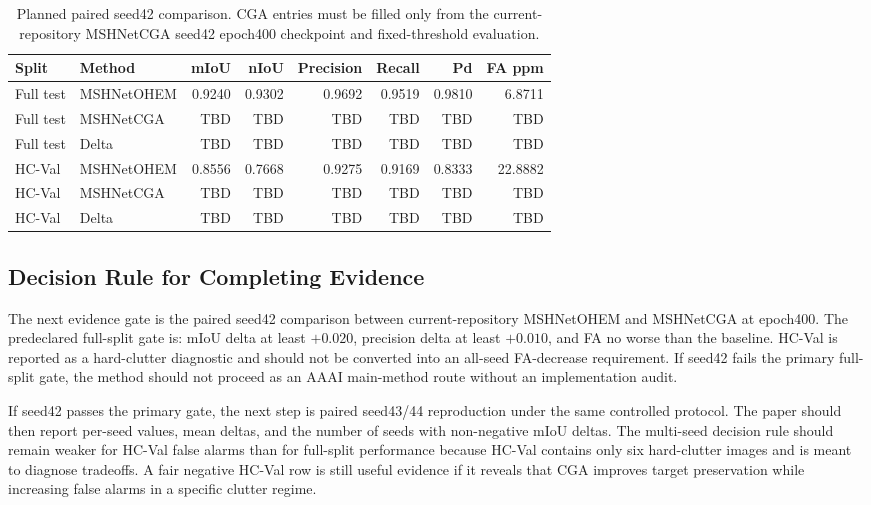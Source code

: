\documentclass[letterpaper]{article}
\begin{document}
\begin{table}[t]
\centering
\caption{Planned paired seed42 comparison. CGA entries must be filled only from the current-repository MSHNetCGA seed42 epoch400 checkpoint and fixed-threshold evaluation.}
\label{tab:paired-main}
\small
\begin{tabular}{llrrrrrr}
\toprule
Split & Method & mIoU & nIoU & Precision & Recall & Pd & FA ppm \\
\midrule
Full test & MSHNetOHEM & 0.9240 & 0.9302 & 0.9692 & 0.9519 & 0.9810 & 6.8711 \\
Full test & MSHNetCGA & TBD & TBD & TBD & TBD & TBD & TBD \\
Full test & Delta & TBD & TBD & TBD & TBD & TBD & TBD \\
\midrule
HC-Val & MSHNetOHEM & 0.8556 & 0.7668 & 0.9275 & 0.9169 & 0.8333 & 22.8882 \\
HC-Val & MSHNetCGA & TBD & TBD & TBD & TBD & TBD & TBD \\
HC-Val & Delta & TBD & TBD & TBD & TBD & TBD & TBD \\
\bottomrule
\end{tabular}
\end{table}

\subsection{Decision Rule for Completing Evidence}

The next evidence gate is the paired seed42 comparison between current-repository MSHNetOHEM and MSHNetCGA at epoch400. The predeclared full-split gate is: mIoU delta at least $+0.020$, precision delta at least $+0.010$, and FA no worse than the baseline. HC-Val is reported as a hard-clutter diagnostic and should not be converted into an all-seed FA-decrease requirement. If seed42 fails the primary full-split gate, the method should not proceed as an AAAI main-method route without an implementation audit.

If seed42 passes the primary gate, the next step is paired seed43/44 reproduction under the same controlled protocol. The paper should then report per-seed values, mean deltas, and the number of seeds with non-negative mIoU deltas. The multi-seed decision rule should remain weaker for HC-Val false alarms than for full-split performance because HC-Val contains only six hard-clutter images and is meant to diagnose tradeoffs. A fair negative HC-Val row is still useful evidence if it reveals that CGA improves target preservation while increasing false alarms in a specific clutter regime.
\end{document}
